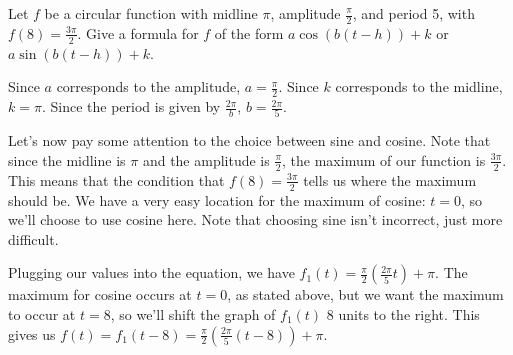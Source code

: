 \documentclass{ximera}
\begin{document}
\begin{example}
Let $f$ be a circular function with midline $\pi$, amplitude $\frac{\pi}{2}$, and period 5, with $f(8) = \frac{3\pi}{2}$. Give a formula for $f$ of the form $a\cos(b(t - h)) + k$ or $a\sin(b(t - h)) + k$.
\begin{explanation}
Since $a$ corresponds to the amplitude, $a = \frac{\pi}{2}$. Since $k$ corresponds to the midline, $k = \pi$. Since the period is given by $\frac{2\pi}{b}$, $b = \frac{2\pi}{5}$. 

Let's now pay some attention to the choice between sine and cosine. Note that since the midline is $\pi$ and the amplitude is $\frac{\pi}{2}$, the maximum of our function is $\frac{3\pi}{2}$. This means that the condition that $f(8) = \frac{3\pi}{2}$ tells us where the maximum should be. We have a very easy location for the maximum of cosine: $t = 0$, so we'll choose to use cosine here. Note that choosing sine isn't incorrect, just more difficult.

Plugging our values into the equation, we have $f_1(t) = \frac{\pi}{2}\left(\frac{2\pi}{5}t\right) + \pi$. The maximum for cosine occurs at $t = 0$, as stated above, but we want the maximum to occur at $t = 8$, so we'll shift the graph of $f_1(t)$ 8 units to the right. This gives us $f(t) = f_1(t - 8) =  \frac{\pi}{2}\left(\frac{2\pi}{5}(t - 8)\right) + \pi$.
\end{explanation}
\end{example}
\end{document}

